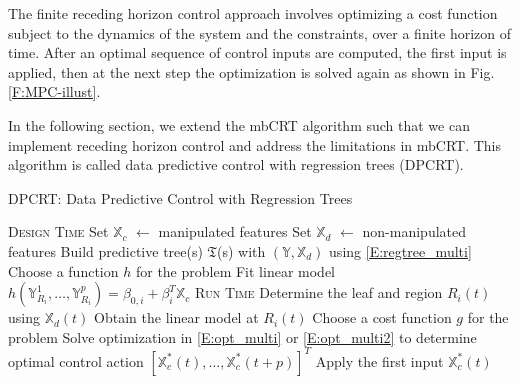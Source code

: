 The finite receding horizon control approach involves optimizing a cost function subject to the dynamics of the system and the constraints, over a finite horizon of time. 
After an optimal sequence of control inputs are computed, the first input is applied, then at the next step the optimization is solved again as shown in Fig. \ref{F:MPC-illust}. 

In the following section, we extend the mbCRT algorithm such that we can implement receding horizon control and address the limitations in mbCRT.  
This algorithm is called data predictive control with regression trees (DPCRT).

\begin{algorithm}[t]
\caption{DPCRT: Data Predictive Control with Regression Trees}
\label{A:DPC}
\begin{algorithmic}[]
\State \textsc{Design Time}
\State Set $\mathbb{X}_c$ $\gets$ manipulated features
\State Set $\mathbb{X}_d$ $\gets$ non-manipulated features
\State Build predictive tree(s) $\mathfrak{T}$(s) with $(\mathbb{Y},\mathbb{X}_d)$ using \eqref{E:regtree_multi}
\State Choose a function $h$ for the problem
\State Fit linear model $\mathit{h} \left( \mathbb{Y}_{R_i}^1, \dots, \mathbb{Y}_{R_i}^p \right) = \beta_{0,i} + \beta^T_i \mathbb{X}_c$
\EndFor
\EndProcedure
\State \textsc{Run Time}
\State Determine the leaf and region $R_{i}(t)$ using $\mathbb{X}_d(t)$
\State Obtain the linear model at $R_{i}(t)$
\State Choose a cost function $g$ for the problem
\State Solve optimization in \eqref{E:opt_multi} or \eqref{E:opt_multi2} to determine optimal control action $\left[\mathbb{X}^*_c(t),\dots,\mathbb{X}^*_c(t+p)\right]^T $
\State Apply the first input $\mathbb{X}^*_c(t)$
\EndWhile
\EndProcedure
\end{algorithmic}
\end{algorithm}

